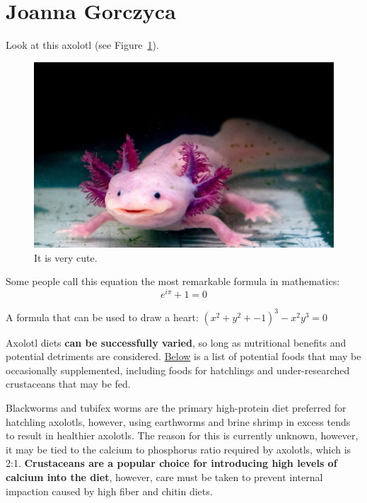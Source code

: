 \section{Joanna Gorczyca}

Look at this axolotl (see Figure~\ref{fig:axolotl_pink}).

\begin{figure}[htbp]
    \centering
    \includegraphics[width=1\textwidth]{pictures/axolotl_pink.jpg}
    \caption{It is very cute.}
    \label{fig:axolotl_pink}
\end{figure}

Some people call this equation the most remarkable formula in mathematics: \[e^{i \pi} + 1 = 0\]

A formula that can be used to draw a heart:
$ (x^{2}+y^{2}+-1)^{3}-x^{2}y^{3}=0 $

\newpage

Axolotl diets \textbf{can be successfully varied}, so long as nutritional benefits and potential detriments are considered. \underline{Below} is a list of potential foods that may be occasionally supplemented, including foods for hatchlings and under-researched crustaceans that may be fed.

Blackworms and tubifex worms are the primary high-protein diet preferred for hatchling axolotls, however, using earthworms and brine shrimp in excess tends to result in healthier axolotls. The reason for this is currently unknown, however, it may be tied to the calcium to phosphorus ratio required by axolotls, which is 2:1. \textbf{Crustaceans are a popular choice for introducing high levels of calcium into the diet}, however, care must be taken to prevent internal impaction caused by high fiber and chitin diets.

